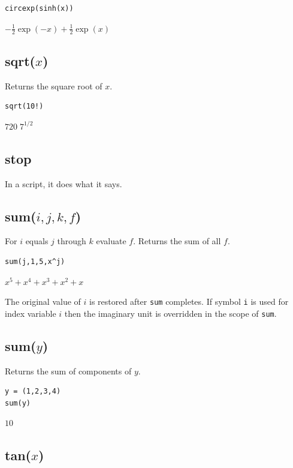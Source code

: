\documentclass[12pt]{article}
\begin{document}
{\color{blue}
\begin{verbatim}
circexp(sinh(x))
\end{verbatim}
}

\noindent
$\displaystyle -\tfrac{1}{2}\exp(-x)+\tfrac{1}{2}\exp(x)$

\subsection*{sqrt($x$)}

Returns the square root of $x$.

{\color{blue}
\begin{verbatim}
sqrt(10!)
\end{verbatim}
}

\noindent
$\displaystyle 720\; 7^{1/2}$

\subsection*{stop}

In a script, it does what it says.

\subsection*{sum($i,j,k,f$)}

For $i$ equals $j$ through $k$ evaluate $f$.
Returns the sum of all $f$.

{\color{blue}
\begin{verbatim}
sum(j,1,5,x^j)
\end{verbatim}
}

\noindent
$\displaystyle x^5+x^4+x^3+x^2+x$

\bigskip
\noindent
The original value of $i$ is restored after {\tt sum} completes.
If symbol {\tt i} is used for index variable $i$
then the imaginary unit is overridden in the scope of {\tt sum}.

\subsection*{sum($y$)}

Returns the sum of components of $y$.

{\color{blue}
\begin{verbatim}
y = (1,2,3,4)
sum(y)
\end{verbatim}
}

\noindent
$10$

\subsection*{tan($x$)}
\end{document}
